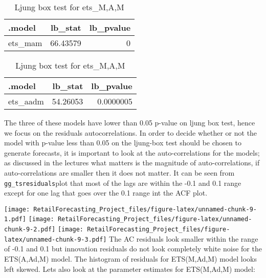 \documentclass[
]{article}
\begin{document}
\begin{table}

\caption{\label{tab:unnamed-chunk-8}Ljung box test for ets_M,A,M}
\centering
\begin{tabular}[t]{l|r|r}
\hline
.model & lb\_stat & lb\_pvalue\\
\hline
ets\_mam & 66.43579 & 0\\
\hline
\end{tabular}
\end{table}

\begin{table}

\caption{\label{tab:unnamed-chunk-8}Ljung box test for ets_M,A,M}
\centering
\begin{tabular}[t]{l|r|r}
\hline
.model & lb\_stat & lb\_pvalue\\
\hline
ets\_aadm & 54.26053 & 0.0000005\\
\hline
\end{tabular}
\end{table}

The three of these models have lower than 0.05 p-value on ljung box
test, hence we focus on the residuals autocorrelations. In order to
decide whether or not the model with p-value less than 0.05 on the
ljung-box test should be chosen to generate forecasts, it is important
to look at the auto-correlations for the models; as discussed in the
lectures what matters is the magnitude of auto-correlations, if
auto-correlations are smaller then it does not matter. It can be seen
from \texttt{gg\_tsresiduals}plot that most of the lags are within the
-0.1 and 0.1 range except for one lag that goes over the 0.1 range int
the ACF plot.

\texttt{[image: RetailForecasting\_Project\_files/figure-latex/unnamed-chunk-9-1.pdf]}
\texttt{[image: RetailForecasting\_Project\_files/figure-latex/unnamed-chunk-9-2.pdf]}
\texttt{[image: RetailForecasting\_Project\_files/figure-latex/unnamed-chunk-9-3.pdf]}
The AC residuals look smaller within the range of -0.1 and 0.1 but
innovation residuals do not look completely white noise for the
ETS(A,Ad,M) model. The histogram of residuals for ETS(M,Ad,M) model
looks left skewed. Lets also look at the parameter estimates for
ETS(M,Ad,M) model:
\end{document}
